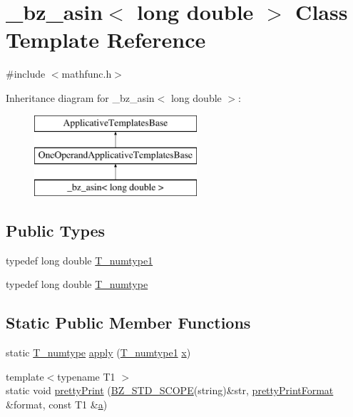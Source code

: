 \hypertarget{class__bz__asin_3_01long_01double_01_4}{}\section{\+\_\+bz\+\_\+asin$<$ long double $>$ Class Template Reference}
\label{class__bz__asin_3_01long_01double_01_4}


{\ttfamily \#include $<$mathfunc.\+h$>$}

Inheritance diagram for \+\_\+bz\+\_\+asin$<$ long double $>$\+:\begin{figure}[H]
\begin{center}
\leavevmode
\includegraphics[height=3.000000cm]{class__bz__asin_3_01long_01double_01_4}
\end{center}
\end{figure}
\subsection*{Public Types}
\begin{DoxyCompactItemize}
\item 
typedef long double \hyperlink{class__bz__asin_3_01long_01double_01_4_a0bc3df3ac6f60dcc0140dfd2375df89e}{T\+\_\+numtype1}
\item 
typedef long double \hyperlink{class__bz__asin_3_01long_01double_01_4_ab399e512b4208b6246b11fd2032838e4}{T\+\_\+numtype}
\end{DoxyCompactItemize}
\subsection*{Static Public Member Functions}
\begin{DoxyCompactItemize}
\item 
static \hyperlink{class__bz__asin_3_01long_01double_01_4_ab399e512b4208b6246b11fd2032838e4}{T\+\_\+numtype} \hyperlink{class__bz__asin_3_01long_01double_01_4_a6b3ca49484ce21931d009cadf94bb88e}{apply} (\hyperlink{class__bz__asin_3_01long_01double_01_4_a0bc3df3ac6f60dcc0140dfd2375df89e}{T\+\_\+numtype1} \hyperlink{vecnorm1_8cc_ac73eed9e41ec09d58f112f06c2d6cb63}{x})
\item 
{\footnotesize template$<$typename T1 $>$ }\\static void \hyperlink{class__bz__asin_3_01long_01double_01_4_a31398e37bc79f860ae355b89631af654}{pretty\+Print} (\hyperlink{numinquire_8h_a2b24ffc3b4ef9803956bc7715c6c7b83}{B\+Z\+\_\+\+S\+T\+D\+\_\+\+S\+C\+O\+P\+E}(string)\&str, \hyperlink{classprettyPrintFormat}{pretty\+Print\+Format} \&format, const T1 \&\hyperlink{gen__mat5files_8m_aae328bf20413f220e38aec4d95bfd6da}{a})
\end{DoxyCompactItemize}


